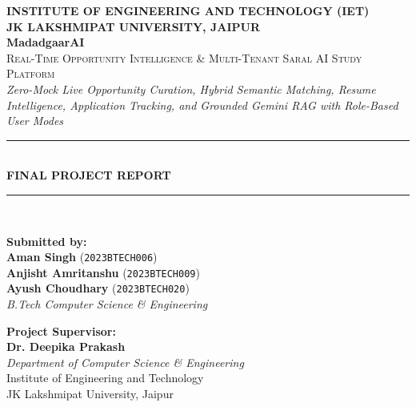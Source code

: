 \documentclass[12pt,a4paper,oneside]{report}
\begin{document}
\begin{titlepage}
    \centering
    \vspace*{0.4cm}

    {\large \textbf{INSTITUTE OF ENGINEERING AND TECHNOLOGY (IET)}}\\[0.15cm]
    {\normalsize \textbf{JK LAKSHMIPAT UNIVERSITY, JAIPUR}}\\[1.0cm]

    {\Huge \bfseries MadadgaarAI}\\[0.35cm]
    {\Large \textsc{Real-Time Opportunity Intelligence \& Multi-Tenant Saral AI Study Platform}}\\[0.25cm]
    {\normalsize \textit{Zero-Mock Live Opportunity Curation, Hybrid Semantic Matching, Resume Intelligence, Application Tracking, and Grounded Gemini RAG with Role-Based User Modes}}\\[1.3cm]

    \rule{\textwidth}{1.5pt}\\[0.5cm]
    {\LARGE \bfseries FINAL PROJECT REPORT}\\[0.35cm]
    \rule{\textwidth}{1.5pt}\\[1.6cm]

    \begin{minipage}[t]{0.52\textwidth}
        \begin{flushleft} \normalsize
            \textbf{Submitted by:}\\[0.2cm]
            \textbf{Aman Singh} \hfill (\texttt{2023BTECH006})\\
            \textbf{Anjisht Amritanshu} \hfill (\texttt{2023BTECH009})\\
            \textbf{Ayush Choudhary} \hfill (\texttt{2023BTECH020})\\[0.25cm]
            \textit{B.Tech Computer Science \& Engineering}
        \end{flushleft}
    \end{minipage}
    \hfill
    \begin{minipage}[t]{0.44\textwidth}
        \begin{flushright} \normalsize
            \textbf{Project Supervisor:}\\[0.2cm]
            \textbf{Dr. Deepika Prakash}\\[0.1cm]
            \textit{Department of Computer Science \& Engineering}\\
            Institute of Engineering and Technology\\
            JK Lakshmipat University, Jaipur
        \end{flushright}
    \end{minipage}


\end{titlepage}
\end{document}

